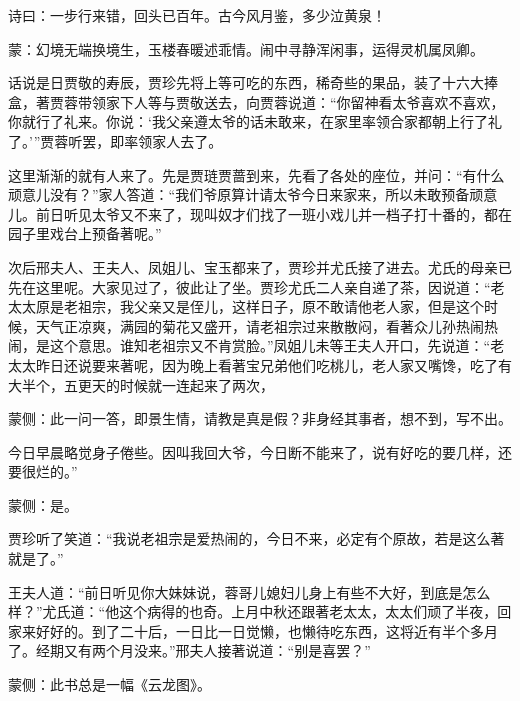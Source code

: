 
\begin{parag}
    诗曰：一步行来错，回头已百年。古今风月鉴，多少泣黄泉！
\end{parag}


\begin{parag}
    \begin{note}蒙：幻境无端换境生，玉楼春暖述乖情。闹中寻静浑闲事，运得灵机属凤卿。\end{note}
\end{parag}


\begin{parag}
    话说是日贾敬的寿辰，贾珍先将上等可吃的东西，稀奇些的果品，装了十六大捧盒，著贾蓉带领家下人等与贾敬送去，向贾蓉说道：“你留神看太爷喜欢不喜欢，你就行了礼来。你说：‘我父亲遵太爷的话未敢来，在家里率领合家都朝上行了礼了。’”贾蓉听罢，即率领家人去了。
\end{parag}


\begin{parag}
    这里渐渐的就有人来了。先是贾琏贾蔷到来，先看了各处的座位，并问：“有什么顽意儿没有？”家人答道：“我们爷原算计请太爷今日来家来，所以未敢预备顽意儿。前日听见太爷又不来了，现叫奴才们找了一班小戏儿并一档子打十番的，都在园子里戏台上预备著呢。”
\end{parag}


\begin{parag}
    次后邢夫人、王夫人、凤姐儿、宝玉都来了，贾珍并尤氏接了进去。尤氏的母亲已先在这里呢。大家见过了，彼此让了坐。贾珍尤氏二人亲自递了茶，因说道：“老太太原是老祖宗，我父亲又是侄儿，这样日子，原不敢请他老人家，但是这个时候，天气正凉爽，满园的菊花又盛开，请老祖宗过来散散闷，看著众儿孙热闹热闹，是这个意思。谁知老祖宗又不肯赏脸。”凤姐儿未等王夫人开口，先说道：“老太太昨日还说要来著呢，因为晚上看著宝兄弟他们吃桃儿，老人家又嘴馋，吃了有大半个，五更天的时候就一连起来了两次，\begin{note}蒙侧：此一问一答，即景生情，请教是真是假？非身经其事者，想不到，写不出。\end{note}今日早晨略觉身子倦些。因叫我回大爷，今日断不能来了，说有好吃的要几样，还要很烂的。”\begin{note}蒙侧：是。\end{note}贾珍听了笑道：“我说老祖宗是爱热闹的，今日不来，必定有个原故，若是这么著就是了。”
\end{parag}


\begin{parag}
    王夫人道：“前日听见你大妹妹说，蓉哥儿媳妇儿身上有些不大好，到底是怎么样？”尤氏道：“他这个病得的也奇。上月中秋还跟著老太太，太太们顽了半夜，回家来好好的。到了二十后，一日比一日觉懒，也懒待吃东西，这将近有半个多月了。经期又有两个月没来。”邢夫人接著说道：“别是喜罢？”\begin{note}蒙侧：此书总是一幅《云龙图》。\end{note}
\end{parag}


